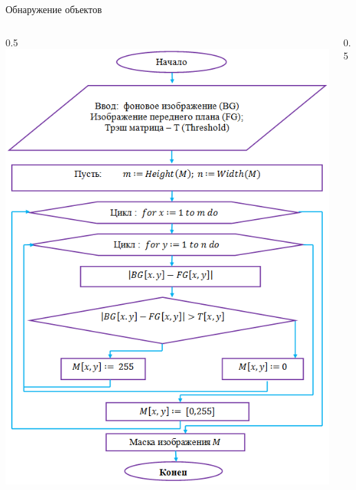 \documentclass[10pt,pdf,hyperref={unicode},xcolor=table]{beamer}
\begin{document}
\begin{frame}{Обнаружение объектов}
\begin{columns}
		\begin{column} {0.5\textwidth}			
			\includegraphics[width=1\linewidth]{p3}
			\end{column}
			\begin{column} {0.5\textwidth}

\end{column}
\end{columns}
\end{frame}
\end{document}
